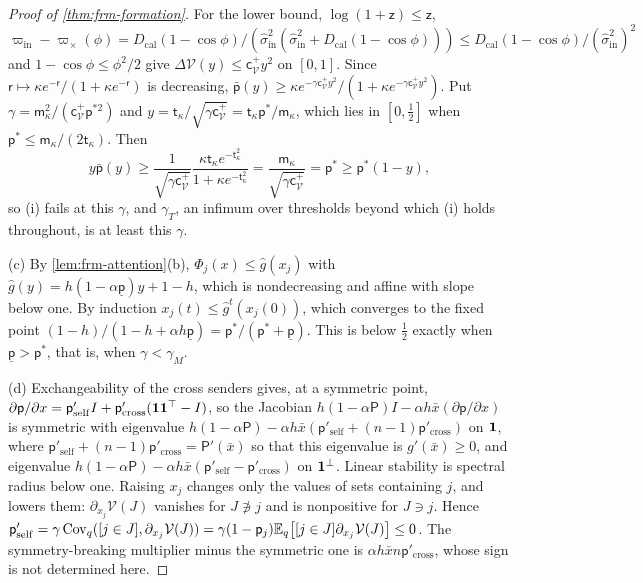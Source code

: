 \begin{proof}[Proof of \cref{thm:frm-formation}]
For the lower bound, $\log(1+\mathsf z)\le\mathsf z$, $\varpi_{\mathrm{in}}-\varpi_\times(\phi)=D_{\mathrm{cal}}(1-\cos\phi)/(\hat\sigma^2_{\mathrm{in}}(\hat\sigma^2_{\mathrm{in}}+D_{\mathrm{cal}}(1-\cos\phi)))\le D_{\mathrm{cal}}(1-\cos\phi)/(\hat\sigma^2_{\mathrm{in}})^2$ and $1-\cos\phi\le\phi^2/2$ give $\Delta\mathcal V(y)\le\mathsf c^+_{\mathcal V}y^2$ on $[0,1]$. Since $\mathsf r\mapsto\kappa e^{-\mathsf r}/(1+\kappa e^{-\mathsf r})$ is decreasing, $\bar{\mathsf p}(y)\ge\kappa e^{-\gamma\mathsf c^+_{\mathcal V}y^2}/(1+\kappa e^{-\gamma\mathsf c^+_{\mathcal V}y^2})$. Put $\gamma=\mathsf m_\kappa^2/(\mathsf c^+_{\mathcal V}\mathsf p^{\ast2})$ and $y=\mathsf t_\kappa/\sqrt{\gamma\mathsf c^+_{\mathcal V}}=\mathsf t_\kappa\mathsf p^\ast/\mathsf m_\kappa$, which lies in $[0,\frac12]$ when $\mathsf p^\ast\le\mathsf m_\kappa/(2\mathsf t_\kappa)$. Then
\begin{equation*}
y\bar{\mathsf p}(y)\ge\frac{1}{\sqrt{\gamma\mathsf c^+_{\mathcal V}}}\frac{\kappa\mathsf t_\kappa e^{-\mathsf t_\kappa^2}}{1+\kappa e^{-\mathsf t_\kappa^2}}=\frac{\mathsf m_\kappa}{\sqrt{\gamma\mathsf c^+_{\mathcal V}}}=\mathsf p^\ast\ge\mathsf p^\ast(1-y),
\end{equation*}
so (i) fails at this $\gamma$, and $\gamma_T$, an infimum over thresholds beyond which (i) holds throughout, is at least this $\gamma$.

(c) By \cref{lem:frm-attention}(b), $\Phi_j(x)\le\hat g(x_j)$ with $\hat g(y)=h(1-\alpha\underline{\mathsf p})y+1-h$, which is nondecreasing and affine with slope below one. By induction $x_j(t)\le\hat g^t(x_j(0))$, which converges to the fixed point $(1-h)/(1-h+\alpha h\underline{\mathsf p})=\mathsf p^\ast/(\mathsf p^\ast+\underline{\mathsf p})$. This is below $\frac12$ exactly when $\underline{\mathsf p}>\mathsf p^\ast$, that is, when $\gamma<\gamma_M$.

(d) Exchangeability of the cross senders gives, at a symmetric point, $\partial\mathsf p/\partial x=\mathsf p'_{\mathrm{self}}I+\mathsf p'_{\mathrm{cross}}(\mathbf{1}\mathbf{1}^\top-I)$, so the Jacobian $h(1-\alpha\mathsf P)I-\alpha h\bar x(\partial\mathsf p/\partial x)$ is symmetric with eigenvalue $h(1-\alpha\mathsf P)-\alpha h\bar x(\mathsf p'_{\mathrm{self}}+(n-1)\mathsf p'_{\mathrm{cross}})$ on $\mathbf{1}$, where $\mathsf p'_{\mathrm{self}}+(n-1)\mathsf p'_{\mathrm{cross}}=\mathsf P'(\bar x)$ so that this eigenvalue is $g'(\bar x)\ge0$, and eigenvalue $h(1-\alpha\mathsf P)-\alpha h\bar x(\mathsf p'_{\mathrm{self}}-\mathsf p'_{\mathrm{cross}})$ on $\mathbf{1}^\perp$. Linear stability is spectral radius below one. Raising $x_j$ changes only the values of sets containing $j$, and lowers them: $\partial_{x_j}\mathcal V(J)$ vanishes for $J\not\ni j$ and is nonpositive for $J\ni j$. Hence $\mathsf p'_{\mathrm{self}}=\gamma\operatorname{Cov}_q([j\in J],\partial_{x_j}\mathcal V(J))=\gamma(1-\mathsf p_j)\mathbb{E}_q\bigl[[j\in J]\partial_{x_j}\mathcal V(J)\bigr]\le0$. The symmetry-breaking multiplier minus the symmetric one is $\alpha h\bar xn\mathsf p'_{\mathrm{cross}}$, whose sign is not determined here.


\end{proof}
